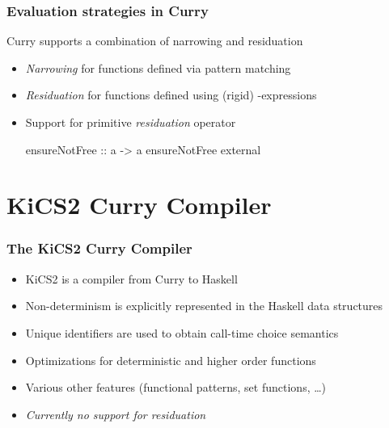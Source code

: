\documentclass[
,hyperref={pdfpagelabels=false}
,xcolor=dvipsnames
]{beamer}
\newcommand{\blocktitle}[1]{%
{\medskip\usebeamerfont{subtitle}\usebeamercolor[fg]{subtitle}#1\smallskip}
}
\begin{document}
\begin{frame}[fragile]%
\frametitle{Evaluation strategies in Curry}


\blocktitle{Curry supports a combination of narrowing and residuation}

\begin{itemize}
\item \emph{Narrowing} for functions defined via pattern matching
\item \emph{Residuation} for functions defined using (rigid)
      -expressions
\item Support for primitive \emph{residuation} operator

\begin{curry}
ensureNotFree :: a -> a
ensureNotFree external
\end{curry}
\end{itemize}

\end{frame}


\section{KiCS2 Curry Compiler}

\begin{frame}[fragile]%
\frametitle{The KiCS2 Curry Compiler}
\begin{itemize}
\item KiCS2 is a compiler from Curry to Haskell
\item Non-determinism is explicitly represented in
      the Haskell data structures
\item Unique identifiers are used to obtain
      call-time choice semantics
\item Optimizations for deterministic and higher order functions
\item Various other features (functional patterns, set functions, \dots)
\item \emph{Currently no support for residuation}
\end{itemize}
\end{frame}
\end{document}
